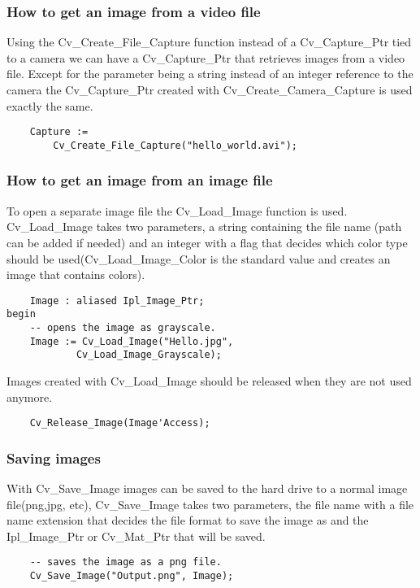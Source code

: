 \subsubsection{How to get an image from a video file}
Using the Cv_Create_File_Capture function instead of a Cv_Capture_Ptr tied to a camera we can have a Cv_Capture_Ptr that retrieves images from a video file. Except for the parameter being a string instead of an integer reference to the camera the Cv_Capture_Ptr created with Cv_Create_Camera_Capture is used exactly the same.
\begin{lstlisting}
	Capture := 
		Cv_Create_File_Capture("hello_world.avi");
\end{lstlisting}
\subsubsection{How to get an image from an image file}
To open a separate image file the Cv_Load_Image function is used. Cv_Load_Image takes two parameters, a string containing the file name (path can be added if needed) and an integer with a flag that decides which color type should be used(Cv_Load_Image_Color is the standard value and creates an image that contains colors). 
\begin{lstlisting}
	Image : aliased Ipl_Image_Ptr;
begin
	-- opens the image as grayscale.
	Image := Cv_Load_Image("Hello.jpg",
		    Cv_Load_Image_Grayscale); 
\end{lstlisting}
Images created with Cv_Load_Image should be released when they are not used anymore.
\begin{lstlisting}
	Cv_Release_Image(Image'Access);
\end{lstlisting}
\subsubsection{Saving images}
With Cv_Save_Image images can be saved to the hard drive to a normal image file(png,jpg, etc), Cv_Save_Image takes two parameters, the file name with a file name extension that decides the file format to save the image as and the Ipl_Image_Ptr or Cv_Mat_Ptr that will be saved.
\begin{lstlisting}
	-- saves the image as a png file.
	Cv_Save_Image("Output.png", Image); 
\end{lstlisting}
